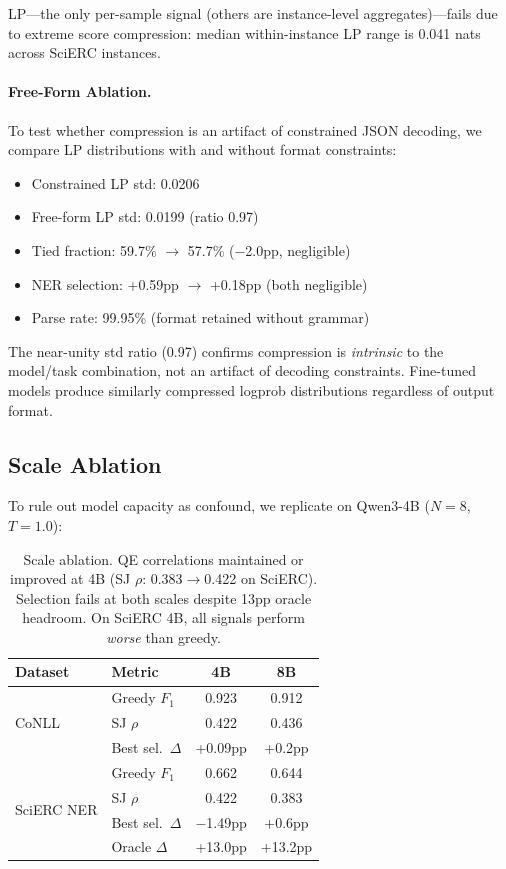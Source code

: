 \documentclass[11pt]{article}
\begin{document}
LP---the only per-sample signal (others are instance-level aggregates)---fails due to extreme score compression: median within-instance LP range is 0.041 nats across SciERC instances.

\paragraph{Free-Form Ablation.} To test whether compression is an artifact of constrained JSON decoding, we compare LP distributions with and without format constraints:

\begin{itemize}
\item Constrained LP std: 0.0206
\item Free-form LP std: 0.0199 (ratio 0.97)
\item Tied fraction: 59.7\% $\rightarrow$ 57.7\% ($-$2.0pp, negligible)
\item NER selection: +0.59pp $\rightarrow$ +0.18pp (both negligible)
\item Parse rate: 99.95\% (format retained without grammar)
\end{itemize}

The near-unity std ratio (0.97) confirms compression is \emph{intrinsic} to the model/task combination, not an artifact of decoding constraints. Fine-tuned models produce similarly compressed logprob distributions regardless of output format.

\subsection{Scale Ablation}

To rule out model capacity as confound, we replicate on Qwen3-4B ($N = 8$, $T = 1.0$):

\begin{table}[t]
\centering
\small
\begin{tabular}{llcc}
\toprule
Dataset & Metric & 4B & 8B \\
\midrule
\multirow{3}{*}{CoNLL} & Greedy $F_1$ & 0.923 & 0.912 \\
& SJ $\rho$ & 0.422 & 0.436 \\
& Best sel.\ $\Delta$ & +0.09pp & +0.2pp \\
\midrule
\multirow{4}{*}{SciERC NER} & Greedy $F_1$ & 0.662 & 0.644 \\
& SJ $\rho$ & 0.422 & 0.383 \\
& Best sel.\ $\Delta$ & $-$1.49pp & +0.6pp \\
& Oracle $\Delta$ & +13.0pp & +13.2pp \\
\bottomrule
\end{tabular}
\caption{Scale ablation. QE correlations maintained or improved at 4B (SJ $\rho$: 0.383$\rightarrow$0.422 on SciERC). Selection fails at both scales despite 13pp oracle headroom. On SciERC 4B, all signals perform \emph{worse} than greedy.}
\label{tab:scale}
\end{table}
\end{document}
